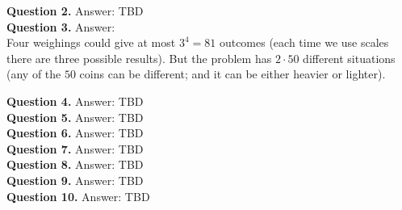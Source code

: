 \documentclass[jou]{apa6}
\begin{document}
\vspace{10pt}
{\bf Question 2.} Answer: TBD \\

\vspace{10pt}
{\bf Question 3.} Answer:\\

Four weighings could give at most $3^4 = 81$ outcomes (each time we use scales there are
three possible results). But the problem has $2 \cdot 50$ different situations
(any of the $50$ coins can be different; and it can be either heavier or lighter). 

\vspace{10pt}
{\bf Question 4.} Answer: TBD \\

\vspace{10pt}
{\bf Question 5.} Answer: TBD \\

\vspace{10pt}
{\bf Question 6.} Answer: TBD \\

\vspace{10pt}
{\bf Question 7.} Answer: TBD \\

\vspace{10pt}
{\bf Question 8.} Answer: TBD \\

\vspace{10pt}
{\bf Question 9.} Answer: TBD \\

\vspace{10pt}
{\bf Question 10.} Answer: TBD \\
\end{document}
